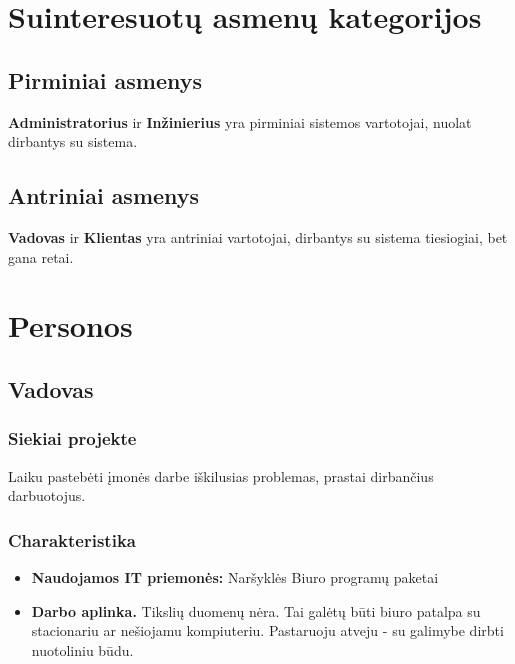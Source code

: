 \section{Suinteresuotų asmenų kategorijos}
	\subsection{Pirminiai asmenys}
	
	\textbf{Administratorius} ir \textbf{Inžinierius} yra pirminiai sistemos vartotojai, nuolat dirbantys su sistema.
	
	\subsection{Antriniai asmenys}
	
	\textbf{Vadovas} ir \textbf{Klientas} yra antriniai vartotojai, dirbantys su sistema tiesiogiai, bet gana retai.

\section{Personos}

	\subsection{Vadovas}
		
		\subsubsection{Siekiai projekte}
		
		Laiku pastebėti įmonės darbe iškilusias problemas, prastai dirbančius darbuotojus.
		
		\subsubsection{Charakteristika}
		
		\begin{itemize}
			\item \textbf{Naudojamos IT priemonės:}
				\subitem Naršyklės
				\subitem Biuro programų paketai
			\item \textbf{Darbo aplinka.} Tikslių duomenų nėra. 
			Tai galėtų būti biuro patalpa su stacionariu ar nešiojamu kompiuteriu.
			Pastaruoju atveju - su galimybe dirbti nuotoliniu būdu.
		\end{itemize}
			
